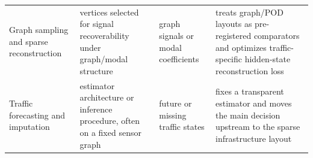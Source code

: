 \begin{table}[pos=htbp]
\begin{tabular}{>{\raggedright\arraybackslash}p{}>{\raggedright\arraybackslash}p{}>{\raggedright\arraybackslash}p{}>{\raggedright\arraybackslash}p{}}
Graph sampling and sparse reconstruction \citep{chen2015sampling,anis2016sampling,manohar2018sparse} & vertices selected for signal recoverability under graph/modal structure & graph signals or modal coefficients & treats graph/POD layouts as pre-registered comparators and optimizes traffic-specific hidden-state reconstruction loss \\
Traffic forecasting and imputation \citep{seo2017survey,coric2012traffic,li2018dcrnn,yu2018stgcn} & estimator architecture or inference procedure, often on a fixed sensor graph & future or missing traffic states & fixes a transparent estimator and moves the main decision upstream to the sparse infrastructure layout \\
\bottomrule
\end{tabular}
\end{table}
